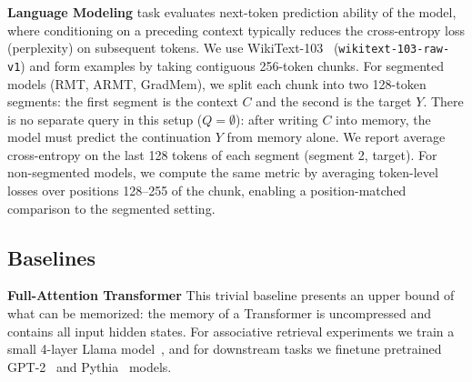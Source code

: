 \documentclass{article}
\theoremstyle{plain}
\theoremstyle{definition}
\theoremstyle{remark}
\begin{document}
{\textbf{Language Modeling}
task evaluates next-token prediction ability of the model, where conditioning on a preceding context typically reduces the cross-entropy loss (perplexity) on subsequent tokens.
We use WikiText-103~\citep{merity2016pointer} (\texttt{wikitext-103-raw-v1}) and form examples by taking contiguous 256-token chunks.
For segmented models (RMT, ARMT, GradMem), we split each chunk into two 128-token segments: the first segment is the context $C$ and the second is the target $Y$.
There is no separate query in this setup ($Q=\emptyset$): after writing $C$ into memory, the model must predict the continuation $Y$ from memory alone.
We report average cross-entropy on the last 128 tokens of each segment (segment 2, target).
For non-segmented models, we compute the same metric by averaging token-level losses over positions 128--255 of the chunk, enabling a position-matched comparison to the segmented setting.

\subsection{Baselines}

\textbf{Full-Attention Transformer}
This trivial baseline
presents an upper bound of what can be memorized: the memory of a Transformer is uncompressed and contains all input hidden states. For associative retrieval experiments we train a small 4-layer Llama model~\citep{touvron2023llama}, and for downstream tasks we finetune pretrained GPT-2~\citep{radford2019language} and Pythia~\citep{biderman2023pythia} models.

}
\end{document}
